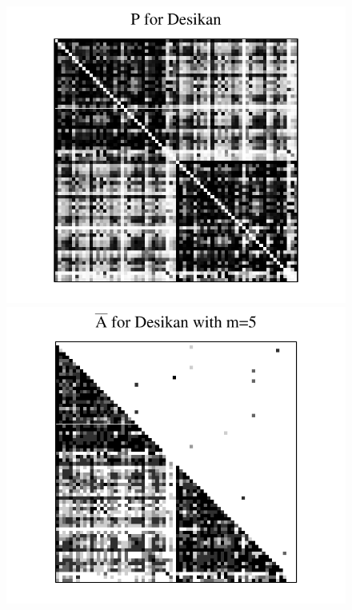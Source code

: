 \begin{figure}[!tbp]
\centering
\includegraphics[height=.2\textheight]{./Figures/P_desikan.pdf} \hspace{-35pt}
\includegraphics[height=.201\textheight]{./Figures/Abar_desikan_m5.pdf} \hspace{-35pt}

\end{figure}
